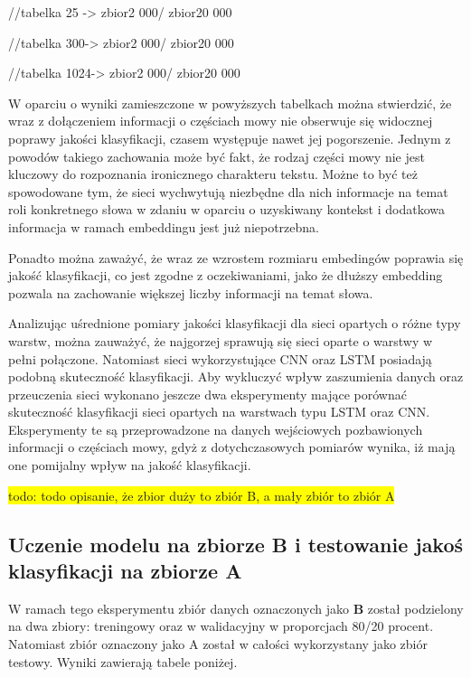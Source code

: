 //tabelka 25 -> zbior2 000/ zbior20 000

//tabelka 300-> zbior2 000/ zbior20 000

//tabelka 1024-> zbior2 000/ zbior20 000

W oparciu o wyniki zamieszczone w powyższych tabelkach można stwierdzić, że wraz z dołączeniem informacji o częściach mowy nie obserwuje się widocznej poprawy jakości klasyfikacji, czasem występuje nawet jej pogorszenie. Jednym z powodów takiego zachowania może być fakt, że rodzaj części mowy nie jest kluczowy do rozpoznania ironicznego charakteru tekstu. Możne to być też spowodowane tym, że sieci wychwytują niezbędne dla nich informacje na temat roli konkretnego słowa w zdaniu w oparciu o uzyskiwany kontekst i dodatkowa informacja w ramach embeddingu jest już niepotrzebna.

Ponadto można zaważyć, że wraz ze wzrostem rozmiaru embedingów poprawia się jakość klasyfikacji, co jest zgodne z oczekiwaniami, jako że dłuższy embedding pozwala na zachowanie większej liczby informacji na temat słowa.


Analizując uśrednione pomiary jakości klasyfikacji dla sieci opartych o różne typy warstw, można zauważyć, że najgorzej sprawują się sieci oparte o warstwy w pełni połączone. Natomiast sieci wykorzystujące CNN oraz LSTM posiadają podobną skuteczność klasyfikacji. Aby wykluczyć wpływ zaszumienia danych oraz przeuczenia sieci wykonano jeszcze dwa eksperymenty mające porównać skuteczność klasyfikacji sieci opartych na warstwach typu LSTM oraz CNN. Eksperymenty te są przeprowadzone na danych wejściowych pozbawionych informacji o częściach mowy, gdyż z dotychczasowych pomiarów wynika, iż mają one pomijalny wpływ na jakość klasyfikacji.

\colorbox{yellow}{todo: todo opisanie, że zbior duży to zbiór B, a mały zbiór to zbiór A}\\
\subsection{Uczenie modelu na zbiorze B i testowanie jakoś klasyfikacji na zbiorze A }

W ramach tego eksperymentu zbiór danych oznaczonych jako \textbf{B} został podzielony na dwa zbiory: treningowy oraz w walidacyjny w proporcjach 80/20 procent. Natomiast zbiór oznaczony jako A został w całości wykorzystany jako zbiór testowy. Wyniki zawierają tabele poniżej.

